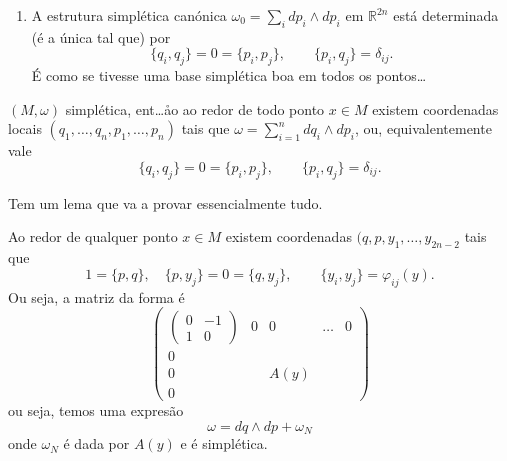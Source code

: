 \begin{remark}
\begin{enumerate}
		\[\omega^\flat =\begin{pmatrix} 0&-I\\I&0 \end{pmatrix} \]
		Mas que n\~ao \'e que a gente tava buscando $\omega^\sharp$? Pois \'e, essa matriz elevada ao quadrado \'e $-\operatorname{id}$, da\'i a sua inversa \'e s\'o botar um signo menos…

		\item A estrutura simpl\'etica can\'onica $\omega_0=\sum_{i}dp_i\wedge dp_i$ em $\mathbb{R}^{2n}$ est\'a determinada (\'e a \'unica tal que) por
			\[\{q_i,q_j\}=0=\{p_i,p_j\},\qquad \{p_i,q_j\} =\delta_{ij}.\]
			\'E como se tivesse uma base simpl\'etica boa em todos os pontos…
	\end{enumerate}
\end{remark}

\begin{thm}[Darboux]\leavevmode
	$(M,\omega)$ simpl\'etica, ent…åo ao redor de todo ponto $x\in M$ existem coordenadas locais $(q_1,\ldots,q_n,p_1,\ldots,p_n)$ tais que $\omega=\sum_{i=1}^ndq_i\wedge dp_i$, ou, equivalentemente vale
		\[\{q_i,q_j\}=0=\{p_i,p_j\},\qquad \{p_i,q_j\} =\delta_{ij}.\]
\end{thm}

Tem um lema que va a provar essencialmente tudo.

\begin{lemma}
	Ao redor de qualquer ponto $x\in M$ existem coordenadas $(q,p,y_1,\ldots,y_{2n-2}$ tais que
	\[1=\{p,q\},\quad \{p,y_j\}=0=\{q,y_j\},\qquad \{y_i,y_j\} =\varphi_{ij}(y).\]
Ou seja, a matriz da forma \'e
\[\begin{pmatrix} \begin{pmatrix}0&-1\\1&0\end{pmatrix}& 0&0&\ldots&0\\
0&&&&\\
0&&A(y)&&\\
0&&&&\end{pmatrix} \]
ou seja, temos uma expres\~ao
\[\omega=dq\wedge dp+\omega_N\]
onde $\omega_N$ \'e dada por $A(y)$ e  \'e simpl\'etica.
\end{lemma}

